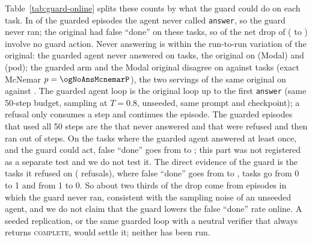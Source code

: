 Table~\ref{tab:guard-online} splits these counts by what the guard could do on each task. In \ogDecNoAnsN{} of the \OgN{} guarded episodes the agent never called \texttt{answer}, so the guard never ran; the original had \ogDecNoAnsFdb{} false ``done'' on these tasks, so \ogDecNoAnsFdb{} of the net drop of \ogFdNetDrop{} (\ogFdBaseN{} to \ogFdGuardN) involve no guard action. Never answering is within the run-to-run variation of the original: the guarded agent never answered on \ogDecNoAnsN{} tasks, the original on \ogNoAnsModal{} (Modal) and \ogNoAnsPod{} (pod); the guarded arm and the Modal original disagree on \ogNoAnsOnlyGuard{} against \ogNoAnsOnlyModal{} tasks (exact McNemar $p=\ogNoAnsMcnemarP$), the two servings of the same original on \ogNoAnsOnlyPod{} against \ogNoAnsOnlyModalPod. The guarded agent loop is the original loop up to the first \texttt{answer} (same 50-step budget, sampling at $T=0.8$, unseeded, same prompt and checkpoint); a refusal only consumes a step and continues the episode. The \ogDecAllCapg{} guarded episodes that used all 50 steps are the \ogDecNoAnsN{} that never answered and \ogCapRefused{} that were refused and then ran out of steps. On the \ogDecAnsN{} tasks where the guarded agent answered at least once, and the guard could act, false ``done'' goes from \ogDecAnsFdb{} to \ogDecAnsFdg; this part was not registered as a separate test and we do not test it. The direct evidence of the guard is the \ogDecRefN{} tasks it refused on (\ogDecRefRef{} refusals), where false ``done'' goes from \ogDecRefFdb{} to \ogDecRefFdg{}, \ogDecRefB{} tasks go from 0 to 1 and \ogDecRefC{} from 1 to 0. So about two thirds of the drop come from episodes in which the guard never ran, consistent with the sampling noise of an unseeded agent, and we do not claim that the guard lowers the false ``done'' rate online. A seeded replication, or the same guarded loop with a neutral verifier that always returns \textsc{complete}, would settle it; neither has been run.

